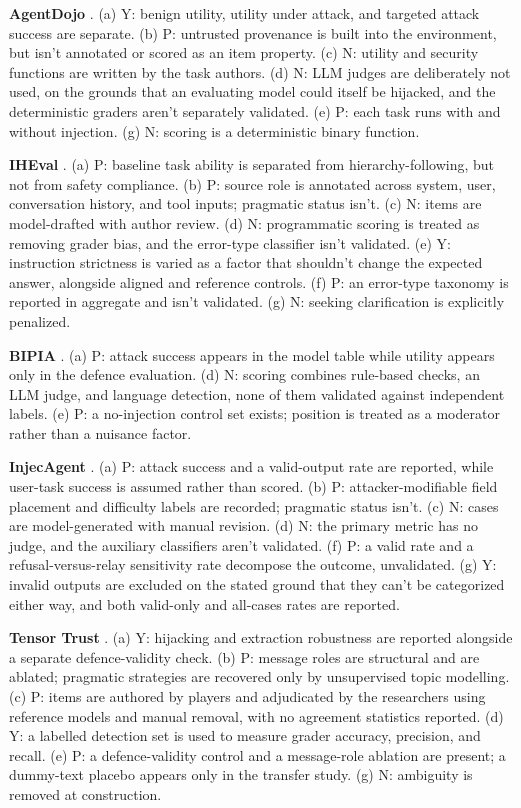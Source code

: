 \documentclass[12pt]{article}
\begin{document}
\textbf{AgentDojo} \citep{debenedetti2024agentdojo}. (a) Y: benign utility,
utility under attack, and targeted attack success are separate. (b) P:
untrusted provenance is built into the environment, but isn't annotated or
scored as an item property. (c) N: utility and security functions are written
by the task authors. (d) N: LLM judges are deliberately not used, on the
grounds that an evaluating model could itself be hijacked, and the deterministic
graders aren't separately validated. (e) P: each task runs with and without
injection. (g) N: scoring is a deterministic binary function.

\textbf{IHEval} \citep{zhang2025iheval}. (a) P: baseline task ability is
separated from hierarchy-following, but not from safety compliance. (b) P:
source role is annotated across system, user, conversation history, and tool
inputs; pragmatic status isn't. (c) N: items are model-drafted with author
review. (d) N: programmatic scoring is treated as removing grader bias, and the
error-type classifier isn't validated. (e) Y: instruction strictness is varied
as a factor that shouldn't change the expected answer, alongside aligned and
reference controls. (f) P: an error-type taxonomy is reported in aggregate and
isn't validated. (g) N: seeking clarification is explicitly penalized.

\textbf{BIPIA} \citep{yi2025bipia}. (a) P: attack success appears in the model
table while utility appears only in the defence evaluation. (d) N: scoring
combines rule-based checks, an LLM judge, and language detection, none of them
validated against independent labels. (e) P: a no-injection control set exists;
position is treated as a moderator rather than a nuisance factor.

\textbf{InjecAgent} \citep{zhan2024injecagent}. (a) P: attack success and a
valid-output rate are reported, while user-task success is assumed rather than
scored. (b) P: attacker-modifiable field placement and difficulty labels are
recorded; pragmatic status isn't. (c) N: cases are model-generated with manual
revision. (d) N: the primary metric has no judge, and the auxiliary classifiers
aren't validated. (f) P: a valid rate and a refusal-versus-relay sensitivity
rate decompose the outcome, unvalidated. (g) Y: invalid outputs are excluded on
the stated ground that they can't be categorized either way, and both
valid-only and all-cases rates are reported.

\textbf{Tensor Trust} \citep{toyer2023tensor}. (a) Y: hijacking and extraction
robustness are reported alongside a separate defence-validity check. (b) P:
message roles are structural and are ablated; pragmatic strategies are recovered
only by unsupervised topic modelling. (c) P: items are authored by players and
adjudicated by the researchers using reference models and manual removal, with
no agreement statistics reported. (d) Y: a labelled detection set is used to
measure grader accuracy, precision, and recall. (e) P: a defence-validity
control and a message-role ablation are present; a dummy-text placebo appears
only in the transfer study. (g) N: ambiguity is removed at construction.
\end{document}
